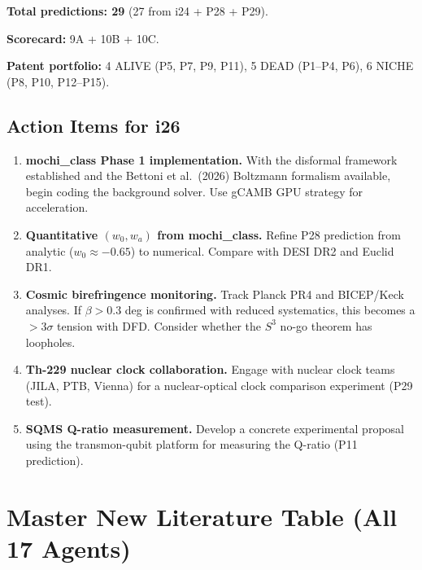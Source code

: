 \documentclass[11pt]{article}
\begin{document}
\begin{tcolorbox}[colback=yellow!5!white, colframe=yellow!50!black,
  title=\textbf{DFD PARADIGM STATE --- i25}]
\textbf{Total predictions: 29} (27 from i24 + P28 + P29).

\textbf{Scorecard:} 9A + 10B + 10C.

\textbf{Patent portfolio:} 4 ALIVE (P5, P7, P9, P11),
5 DEAD (P1--P4, P6), 6 NICHE (P8, P10, P12--P15).

\end{tcolorbox}

\subsection{Action Items for i26}

\begin{tcolorbox}[colback=red!5!white, colframe=red!70!black,
  title=\textbf{PRIORITY ACTION ITEMS FOR i26}]

\begin{enumerate}

\item \textbf{mochi\_class Phase 1 implementation.}
  With the disformal framework established and the Bettoni et al.\
  (2026) Boltzmann formalism available, begin coding the background
  solver. Use gCAMB GPU strategy for acceleration.

\item \textbf{Quantitative $(w_0, w_a)$ from mochi\_class.}
  Refine P28 prediction from analytic ($w_0 \approx -0.65$) to
  numerical. Compare with DESI DR2 and Euclid DR1.

\item \textbf{Cosmic birefringence monitoring.}
  Track Planck PR4 and BICEP/Keck analyses. If $\beta > 0.3$ deg
  is confirmed with reduced systematics, this becomes a $> 3\sigma$
  tension with DFD. Consider whether the $S^3$ no-go theorem has
  loopholes.

\item \textbf{Th-229 nuclear clock collaboration.}
  Engage with nuclear clock teams (JILA, PTB, Vienna) for a
  nuclear-optical clock comparison experiment (P29 test).

\item \textbf{SQMS Q-ratio measurement.}
  Develop a concrete experimental proposal using the transmon-qubit
  platform for measuring the Q-ratio (P11 prediction).

\end{enumerate}
\end{tcolorbox}


\section{Master New Literature Table (All 17 Agents)}
\end{document}
